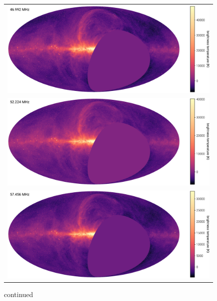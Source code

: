 \documentclass[twocolumn]{aastex61}
\begin{document}
\addtocounter{figure}{-1}
\begin{figure}[p]
    \centering
    \begin{tabular}{c}
        \includegraphics[height=0.32\textheight]{figures/channel-maps/spw08} \\
        \includegraphics[height=0.32\textheight]{figures/channel-maps/spw10} \\
        \includegraphics[height=0.32\textheight]{figures/channel-maps/spw12} \\
    \end{tabular}
    \caption{
        continued
    }
\end{figure}
\end{document}
